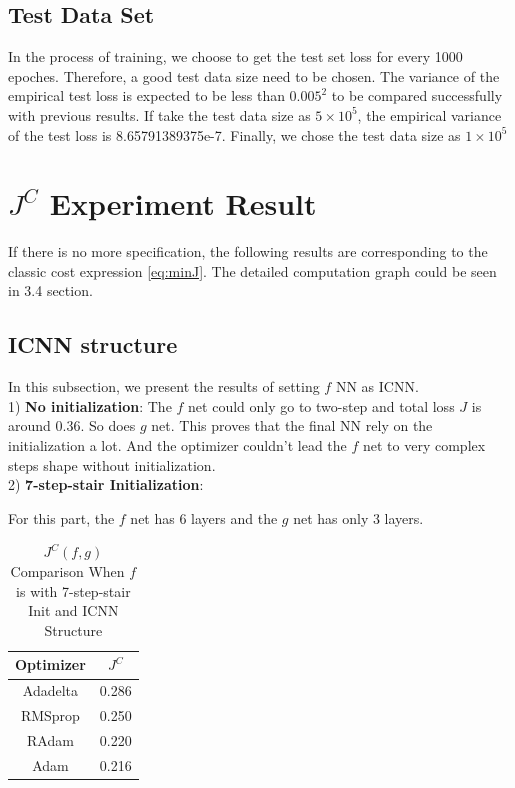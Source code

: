 \documentclass[conference,compsoc]{IEEEtran}
\begin{document}
\subsection{Test Data Set}
In the process of training, we choose to get the test set loss for every 1000 epoches. Therefore, a good test data size need to be chosen. The variance of the empirical test loss is expected to be less than $0.005^2$ to be compared successfully with previous results. If take the test data size as $5\times10^5$, the empirical variance of the test loss is 8.65791389375e-7. Finally, we chose the test data size as $1\times10^5$

\section{$J^C$ Experiment Result}
If there is no more specification, the following results are corresponding to the classic cost expression \eqref{eq:minJ}. The detailed computation graph could be seen in 3.4 section.
\subsection{ICNN structure}
In this subsection, we present the results of setting $f$ NN as ICNN. \\

1) \textbf{No initialization}:
The $f$ net could only go to two-step and total loss $J$ is around 0.36. So does $g$ net. This proves that the final NN rely on the initialization a lot. And the optimizer couldn't lead the $f$ net to very complex steps shape without initialization.\\

2) \textbf{7-step-stair Initialization}:

For this part, the $f$ net has 6 layers  and the $g$ net has only 3 layers. 
\begin{table}[htbp]
  \caption{$J^{C}(f,g)$ Comparison When $f$ is with 7-step-stair Init and ICNN Structure }
  \begin{center}
  \begin{tabular}{|c|c|}
  \hline
  \textbf{Optimizer}& $J^{C}$ \\
  \hline

  Adadelta & 0.286\\
  RMSprop& 0.250 \\
  RAdam & 0.220\\
  Adam & 0.216\\
  \hline

\end{tabular}
  \label{tab1e results}
  \end{center}
  \end{table}
  
\end{document}

